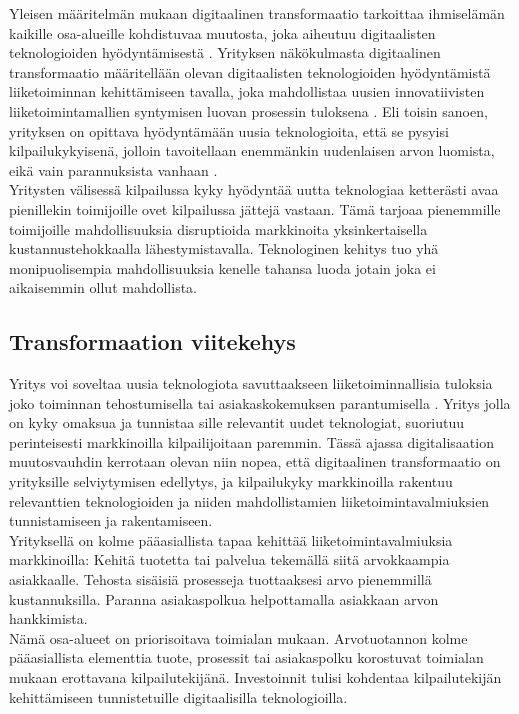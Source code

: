 \documentclass[finnish,12pt,a4paper,pdftex]{article}
\begin{document}
Yleisen määritelmän mukaan digitaalinen transformaatio tarkoittaa ihmiselämän kaikille osa-alueille kohdistuvaa muutosta, joka aiheutuu digitaalisten teknologioiden hyödyntämisestä \citep{leanit}. Yrityksen näkökulmasta digitaalinen transformaatio määritellään olevan digitaalisten teknologioiden hyödyntämistä liiketoiminnan kehittämiseen tavalla, joka mahdollistaa uusien innovatiivisten liiketoimintamallien syntymisen luovan prosessin tuloksena \citep{knobel}. Eli toisin sanoen, yrityksen on opittava hyödyntämään uusia teknologioita, että se pysyisi kilpailukykyisenä, jolloin tavoitellaan enemmänkin uudenlaisen arvon luomista, eikä vain parannuksista vanhaan \citep{susanmoore}. \\

Yritysten välisessä kilpailussa kyky hyödyntää uutta teknologiaa ketterästi avaa pienillekin toimijoille ovet kilpailussa jättejä vastaan. Tämä tarjoaa pienemmille toimijoille mahdollisuuksia disruptioida markkinoita yksinkertaisella kustannustehokkaalla lähestymistavalla. Teknologinen kehitys tuo yhä monipuolisempia mahdollisuuksia kenelle tahansa luoda jotain joka ei aikaisemmin ollut mahdollista. \citep{lamoureux}

\subsection{Transformaation viitekehys}

Yritys voi soveltaa uusia teknologiota savuttaakseen liiketoiminnallisia tuloksia joko toiminnan tehostumisella tai asiakaskokemuksen parantumisella \citep{ibmtrans}. Yritys jolla on kyky omaksua ja tunnistaa sille relevantit uudet teknologiat, suoriutuu perinteisesti markkinoilla kilpailijoitaan paremmin. Tässä ajassa digitalisaation muutosvauhdin kerrotaan olevan niin nopea, että digitaalinen transformaatio on yrityksille selviytymisen edellytys, ja kilpailukyky markkinoilla rakentuu relevanttien teknologioiden ja niiden mahdollistamien liiketoimintavalmiuksien tunnistamiseen ja rakentamiseen. \citep{lamoureux}\\

Yrityksellä on kolme pääasiallista tapaa kehittää liiketoimintavalmiuksia markkinoilla: Kehitä tuotetta tai palvelua tekemällä siitä arvokkaampia asiakkaalle. Tehosta sisäisiä prosesseja tuottaaksesi arvo pienemmillä kustannuksilla. Paranna asiakaspolkua helpottamalla asiakkaan arvon hankkimista. \citep{lamoureux}\\

Nämä osa-alueet on priorisoitava toimialan mukaan. Arvotuotannon kolme pääasiallista elementtia tuote, prosessit tai asiakaspolku korostuvat toimialan mukaan erottavana kilpailutekijänä. Investoinnit tulisi kohdentaa kilpailutekijän kehittämiseen tunnistetuille digitaalisilla teknologioilla. \citep{lamoureux}\\
\end{document}

